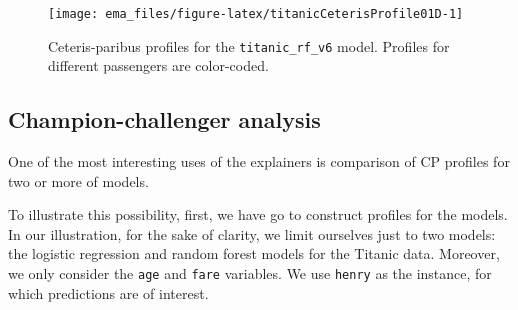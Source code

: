 \documentclass[]{krantz}
\newenvironment{Shaded}{\begin{snugshade}}{\end{snugshade}}
\newcommand{\DataTypeTok}[1]{\textcolor[rgb]{0.13,0.29,0.53}{#1}}
\newcommand{\DecValTok}[1]{\textcolor[rgb]{0.00,0.00,0.81}{#1}}
\newcommand{\KeywordTok}[1]{\textcolor[rgb]{0.13,0.29,0.53}{\textbf{#1}}}
\newcommand{\NormalTok}[1]{#1}
\newcommand{\OperatorTok}[1]{\textcolor[rgb]{0.81,0.36,0.00}{\textbf{#1}}}
\newcommand{\StringTok}[1]{\textcolor[rgb]{0.31,0.60,0.02}{#1}}
\begin{document}
\begin{Shaded}
\end{Shaded}

\begin{figure}

{\centering \texttt{[image: ema\_files/figure-latex/titanicCeterisProfile01D-1]} 

}

\caption{Ceteris-paribus profiles for the \texttt{titanic\_rf\_v6} model. Profiles for different passengers are color-coded.}\label{fig:titanicCeterisProfile01D}
\end{figure}

\hypertarget{champion-challenger-analysis}{%
\subsection{Champion-challenger analysis}\label{champion-challenger-analysis}}

One of the most interesting uses of the explainers is comparison of CP profiles for two or more of models.

To illustrate this possibility, first, we have go to construct profiles for the models. In our illustration, for the sake of clarity, we limit ourselves just to two models: the logistic regression and random forest models for the Titanic data. Moreover, we only consider the \texttt{age} and \texttt{fare} variables. We use \texttt{henry} as the instance, for which predictions are of interest.
\end{document}
